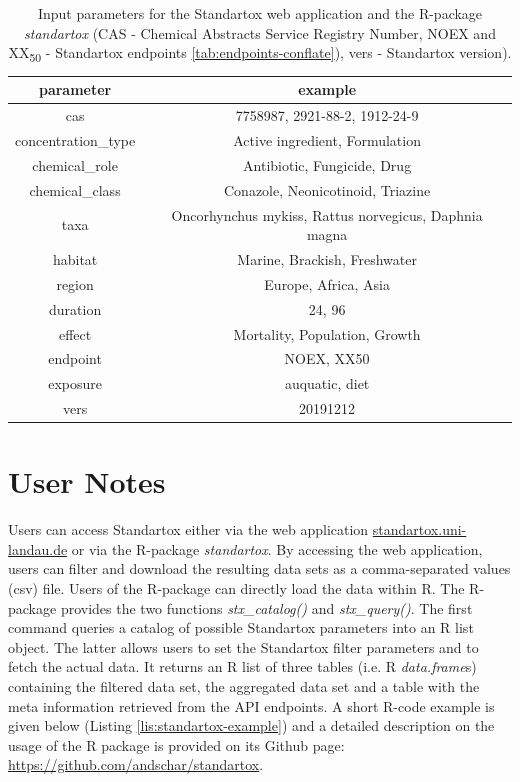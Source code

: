 \documentclass[journal,datadescriptor,submit,moreauthors,pdftex]{Definitions/mdpi}
\begin{document}
\begin{table}[H]
    \caption{Input parameters for the Standartox web application and the R-package \textit{standartox} (CAS - Chemical Abstracts Service Registry Number, NOEX and XX\textsubscript{50} - Standartox endpoints \ref{tab:endpoints-conflate}), vers - Standartox version).}
    \label{tab:app-parameters}
    \centering
    \begin{tabular}{cc}
    \toprule
    \textbf{parameter} & \textbf{example} \\ 
    \midrule
    cas & 7758987, 2921-88-2, 1912-24-9 \\
    concentration\_type & Active ingredient, Formulation \\
    chemical\_role & Antibiotic, Fungicide, Drug \\
    chemical\_class & Conazole, Neonicotinoid, Triazine \\
    taxa & Oncorhynchus mykiss, Rattus norvegicus, Daphnia magna \\
    habitat & Marine, Brackish, Freshwater \\
    region & Europe, Africa, Asia \\
    duration & 24, 96 \\
    effect & Mortality, Population, Growth \\
    endpoint & NOEX, XX50 \\
    exposure & auquatic, diet \\
    vers & 20191212 \\
    \bottomrule
\end{tabular}
\end{table}

\section{User Notes}
Users can access Standartox either via the web application \url{standartox.uni-landau.de} or via the R-package \textit{standartox}. By accessing the web application, users can filter and download the resulting data sets as a comma-separated values (csv) file. Users of the R-package can directly load the data within R. The R-package provides the two functions \textit{stx\_catalog()} and \textit{stx\_query()}. The first command queries a catalog of possible Standartox parameters into an R list object. The latter allows users to set the Standartox filter parameters and to fetch the actual data. It returns an R list of three tables (i.e. R \textit{data.frame}s) containing the filtered data set, the aggregated data set and a table with the meta information retrieved from the API endpoints. A short R-code example is given below (Listing \ref{lis:standartox-example}) and a detailed description on the usage of the R package is provided on its Github page: \url{https://github.com/andschar/standartox}.
\end{document}
